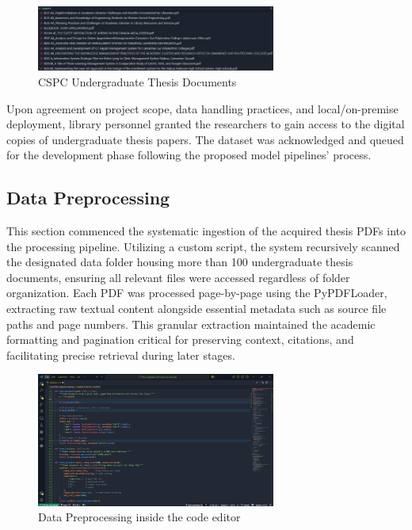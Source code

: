 \begin{refsection}
\begin{figure}[h]
    \centering
    \includegraphics[width=0.7\textwidth]{figures/tsis_docs.png}
    \caption{CSPC Undergraduate Thesis Documents}
\end{figure}

Upon agreement on project scope, data handling practices, and local/on-premise deployment, library personnel granted the researchers to gain access to the digital copies of undergraduate thesis papers. The dataset was acknowledged and queued for the development phase following the proposed model pipelines’ process.

\subsection{Data Preprocessing}
This section commenced the systematic ingestion of the acquired thesis PDFs into the processing pipeline. Utilizing a custom script, the system recursively scanned the designated data folder housing more than 100 undergraduate thesis documents, ensuring all relevant files were accessed regardless of folder organization. Each PDF was processed page-by-page using the PyPDFLoader, extracting raw textual content alongside essential metadata such as source file paths and page numbers. This granular extraction maintained the academic formatting and pagination critical for preserving context, citations, and facilitating precise retrieval during later stages.

\begin{figure}[h]
    \centering
    \includegraphics[width=0.7\textwidth]{figures/dtprprcss.png}
    \caption{Data Preprocessing inside the code editor}
\end{figure}


\end{refsection}
